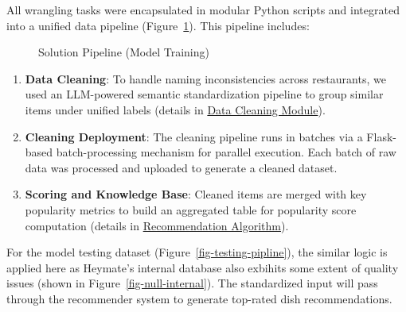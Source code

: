 \documentclass[
  11pt,
  a4paper,
  DIV=11,
  numbers=noendperiod]{scrartcl}
\providecommand{\tightlist}{%
  \setlength{\itemsep}{0pt}\setlength{\parskip}{0pt}}\usepackage{longtable,booktabs,array}
\begin{document}
All wrangling tasks were encapsulated in modular Python scripts and
integrated into a unified data pipeline
(Figure~\ref{fig-training-pipline}). This pipeline includes:

\begin{figure}

\caption{\label{fig-training-pipline}Solution Pipeline (Model Training)}


\end{figure}%

\begin{enumerate}
\def\labelenumi{\arabic{enumi}.}
\tightlist
\item
  \textbf{Data Cleaning}: To handle naming inconsistencies across
  restaurants, we used an LLM-powered semantic standardization pipeline
  to group similar items under unified labels (details in
  \hyperref[data-cleaning-module]{Data Cleaning Module}).
\item
  \textbf{Cleaning Deployment}: The cleaning pipeline runs in batches
  via a Flask-based batch-processing mechanism for parallel execution.
  Each batch of raw data was processed and uploaded to generate a
  cleaned dataset.
\item
  \textbf{Scoring and Knowledge Base}: Cleaned items are merged with key
  popularity metrics to build an aggregated table for popularity score
  computation (details in
  \hyperref[recommendations-algorithm]{Recommendation Algorithm}).
\end{enumerate}

For the model testing dataset (Figure~\ref{fig-testing-pipline}), the
similar logic is applied here as Heymate's internal database also
exbihits some extent of quality issues (shown in
Figure~\ref{fig-null-internal}). The standardized input will pass
through the recommender system to generate top-rated dish
recommendations.
\end{document}

